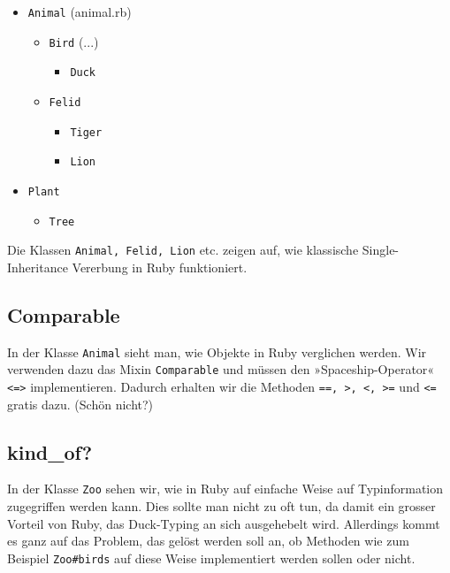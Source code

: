 \documentclass[a4book,11pt,twoside]{scrbook}
\begin{document}
\begin{itemize}
	\item \texttt{Animal} (animal.rb)
	\begin{itemize}
		\item \texttt{Bird} (...)
		\begin{itemize}
			\item \texttt{Duck}
		\end{itemize}
		
		\item \texttt{Felid}
		\begin{itemize}
			\item \texttt{Tiger}
			\item \texttt{Lion}
		\end{itemize}
	\end{itemize}
	
	\item \texttt{Plant}
	\begin{itemize}
		\item \texttt{Tree}
	\end{itemize}
\end{itemize}

Die Klassen \texttt{Animal, Felid, Lion} etc. zeigen auf, wie klassische Single-Inheritance Vererbung in Ruby funktioniert.

\subsection*{Comparable} %
\label{sub:comparable}
In der Klasse \texttt{Animal} sieht man, wie Objekte in Ruby verglichen werden. Wir verwenden dazu das Mixin \texttt{Comparable} und müssen den »Spaceship-Operator« \texttt{<=>} implementieren. Dadurch erhalten wir die Methoden \texttt{==, >, <, >=} und \texttt{<=} gratis dazu. (Schön nicht?)

\subsection*{kind\_of?} %
\label{sub:kind_of_}
In der Klasse \texttt{Zoo} sehen wir, wie in Ruby auf einfache Weise auf Typinformation zugegriffen werden kann. Dies sollte man nicht zu oft tun, da damit ein grosser Vorteil von Ruby, das Duck-Typing an sich ausgehebelt wird. Allerdings kommt es ganz auf das Problem, das gelöst werden soll an, ob Methoden wie zum Beispiel \texttt{Zoo\#birds} auf diese Weise implementiert werden sollen oder nicht.
\end{document}
